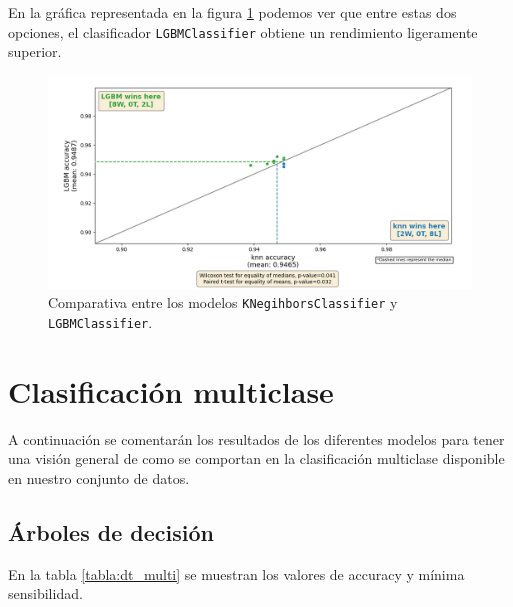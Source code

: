 En la gráfica representada en la figura \ref{fig:vs_bin} podemos ver que entre estas dos opciones, el clasificador \texttt{LGBMClassifier} obtiene un rendimiento ligeramente superior.

\begin{figure}[H]
	\centering
	\includegraphics[width=1\linewidth]{Imagenes/vs_bin}
	\caption[Comparativa entre los modelos \texttt{KNegihborsClassifier} y \texttt{LGBMClassifier}]{Comparativa entre los modelos \texttt{KNegihborsClassifier} y \texttt{LGBMClassifier}.}
	\label{fig:vs_bin}
\end{figure}

\newpage
\section{Clasificación multiclase}
\label{sec:clas_multi}

A continuación se comentarán los resultados de los diferentes modelos para tener una visión general de como se comportan en la clasificación multiclase disponible en nuestro conjunto de datos.

\subsection{Árboles de decisión}
\label{subsec:dt_multi}

En la tabla \ref{tabla:dt_multi} se muestran los valores de accuracy y mínima sensibilidad.

